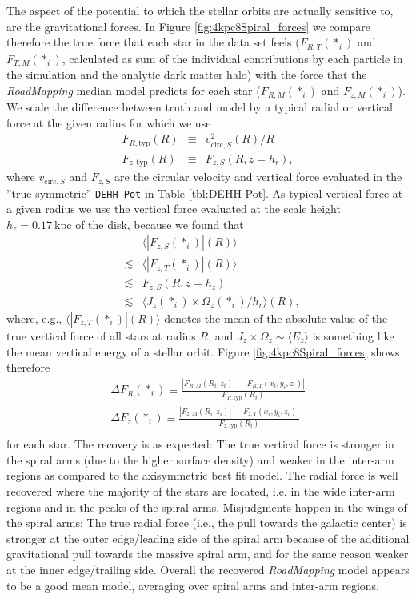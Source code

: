 \documentclass[iop,revtex4,numberedappendix,appendixfloats]{emulateapj}
\newcommand{\RM}{{\sl RoadMapping}}
\begin{document}
The aspect of the potential to which the stellar orbits are actually sensitive to, are the gravitational forces. In Figure \ref{fig:4kpc8Spiral_forces} we compare therefore the true force that each star in the data set feels ($F_{R,T}(*_i)$ and $F_{T,M}(*_i)$, calculated as sum of the individual contributions by each particle in the simulation and the analytic dark matter halo) with the force that the \RM{} median model predicts for each star ($F_{R,M}(*_i)$ and $F_{z,M}(*_i)$). We scale the difference between truth and model by a typical radial or vertical force at the given radius for which we use
\begin{eqnarray}
F_{R,\text{typ}}(R) &\equiv& v^2_{\text{circ},S}(R) / R\\
F_{z,\text{typ}}(R) &\equiv& F_{z,S}(R,z=h_r),
\end{eqnarray}
where $v_{\text{circ},S}$ and $F_{z,S}$ are the circular velocity and vertical force evaluated in the ''true symmetric'' \texttt{DEHH-Pot} in Table \ref{tbl:DEHH-Pot}. As typical vertical force at a given radius we use the vertical force evaluated at the scale height $h_z=0.17~\text{kpc}$ of the disk, because we found that 
\begin{eqnarray*} 
&&\langle |F_{z,S} (*_i)| (R) \rangle \\
&\lesssim& \langle |F_{z,T}(*_i)|  (R) \rangle\\
&\lesssim& F_{z,S}(R,z=h_z) \\
&\lesssim& \langle J_z(*_i) \times \Omega_z(*_i) / h_r \rangle (R),
\end{eqnarray*}
where, e.g., $\langle |F_{z,T}(*_i)|  (R) \rangle$ denotes the mean of the absolute value of the true vertical force of all stars at radius $R$, and $J_z \times \Omega_z \sim \langle E_z \rangle$ is something like the mean vertical energy of a stellar orbit. Figure \ref{fig:4kpc8Spiral_forces} shows therefore
\begin{eqnarray}
\Delta F_R(*_i) \equiv \frac{|F_{R,M}(R_i,z_i)| - |F_{R,T}(x_i,y_i,z_i)|}{F_{R,\text{typ}}(R_i)}\label{eq:delta_FR}\\
\Delta F_z(*_i) \equiv \frac{|F_{z,M}(R_i,z_i)| - |F_{z,T}(x_i,y_i,z_i)|}{F_{z,\text{typ}}(R_i)}\label{eq:delta_Fz}\\
\end{eqnarray}
for each star. The recovery is as expected: The true vertical force is stronger in the spiral arms (due to the higher surface density) and weaker in the inter-arm regions as compared to the axisymmetric best fit model. The radial force is well recovered where the majority of the stars are located, i.e. in the wide inter-arm regions and in the peaks of the spiral arms. Misjudgments happen in the wings of the spiral arms: The true radial force (i.e., the pull towards the galactic center) is stronger at the outer edge/leading side of the spiral arm because of the additional gravitational pull towards the massive spiral arm, and for the same reason weaker at the inner edge/trailing side. Overall the recovered \RM{} model appears to be a good mean model, averaging over spiral arms and inter-arm regions.
\end{document}
